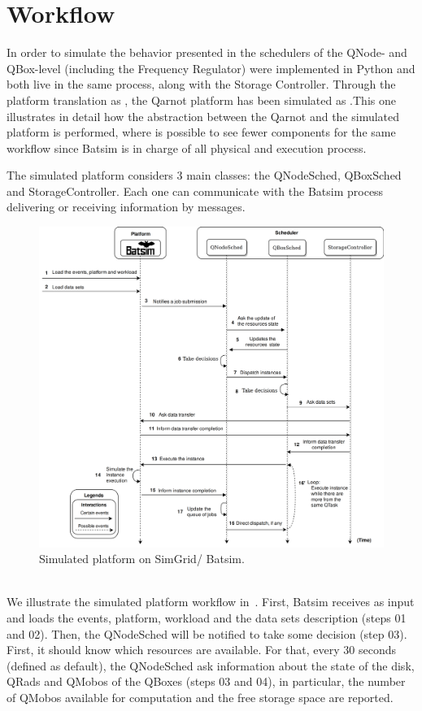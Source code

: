 \section{Workflow}

In order to simulate the behavior presented in  the schedulers of the QNode- and QBox-level (including the Frequency Regulator) were implemented in Python and both live in the same process, along with the Storage Controller. Through the platform translation as , the Qarnot platform has been simulated as .This one illustrates in detail how the abstraction between the Qarnot and the simulated platform is performed, where is possible to see fewer components for the same workflow since Batsim is in charge of all physical and execution process.
    
The simulated platform considers 3 main classes: the QNodeSched, QBoxSched and StorageController. Each one can communicate with the Batsim process delivering or receiving information by messages.

\begin{figure} [h] %
    \centering
    \includegraphics[width=1\textwidth]{images/simulated-platform.png}
    \caption{Simulated platform on SimGrid/ Batsim.}
    \label{fig:SimulatedPlatform}
\end{figure}

\\
We illustrate the simulated platform workflow in~. First, Batsim receives as input and loads the events, platform, workload and the data sets description (steps 01 and 02). Then, the QNodeSched will be notified to take some decision (step 03).
First, it should know which resources are available. For that, every 30 seconds (defined as default), the QNodeSched ask information about the state of the disk, QRads and QMobos of the QBoxes (steps 03 and 04), in particular, the number of QMobos available for computation and the free storage space are reported.

